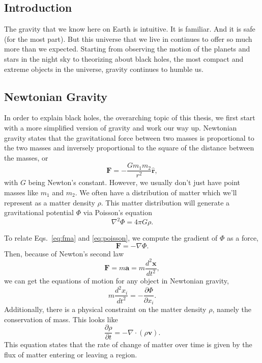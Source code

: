 \begin{bibunit}[unsrtnat]
\chapter{Introduction\label{ch:intro}}

The gravity that we know here on Earth is intuitive. It is familiar. And it is
safe (for the most part). But this universe that we live in continues to offer
so much more than we expected. Starting from observing the motion of the planets
and stars in the night sky to theorizing about black holes, the most compact and
extreme objects in the universe, gravity continues to humble us.

\section{Newtonian Gravity}

In order to explain black holes, the overarching topic of this thesis, we
first start with a more simplified version of gravity and work our way up.
Newtonian gravity states that the gravitational force between two masses is
proportional to the two masses and inversely proportional to the square of the
distance between the masses, or
\begin{equation}\label{eq:fma}
   \mathbf{F} = -\frac{Gm_1m_2}{r^2}\mathbf{\hat{r}} ,
\end{equation}
with $G$ being Newton's constant. However, we usually don't just have point
masses like $m_1$ and $m_2$. We often have a distribution of matter which we'll
represent as a matter density $\rho$. This matter distribution will generate a
gravitational potential $\Phi$ via Poisson's equation
\begin{equation}\label{eq:poisson}
   \nabla^2\Phi = 4\pi G\rho .
\end{equation}

To relate Eqs.~\ref{eq:fma} and \ref{eq:poisson}, we compute the gradient of
$\Phi$ as a force,
\begin{equation}
    \mathbf{F} = -\nabla\Phi.
\end{equation}
Then, because of Newton's second law
\begin{equation}
   \mathbf{F} = m\mathbf{a} = m\frac{d^2\mathbf{x}}{dt^2},
\end{equation}
we can get the equations of motion for any object in Newtonian gravity,
\begin{equation}
   m\frac{d^2x_i}{dt^2} = -\frac{\partial \Phi}{\partial x_i} .
\end{equation}
Additionally, there is a physical constraint on the matter density $\rho$,
namely the conservation of mass. This looks like
\begin{equation}
   \frac{\partial\rho}{\partial t} = -\nabla\cdot(\rho\mathbf{v}).
\end{equation}
This equation states that the rate of change of matter over time is given by the
flux of matter entering or leaving a region.


\end{bibunit}
